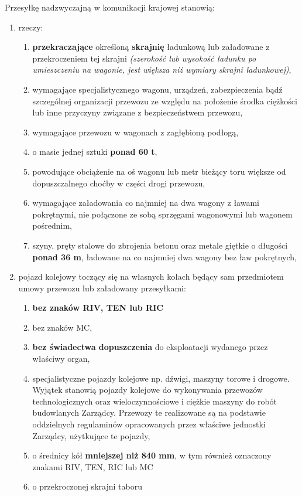 Przesyłkę nadzwyczajną w komunikacji krajowej stanowią:

\begin{enumerate}
	\item rzeczy:
	\begin{enumerate}
		\item \textbf{przekraczające} określoną \textbf{skrajnię} ładunkową lub załadowane z przekroczeniem tej skrajni \textit{(szerokość lub wysokość ładunku po umieszczeniu na wagonie, jest większa niż wymiary skrajni ładunkowej)},
		\item wymagające specjalistycznego wagonu, urządzeń, zabezpieczenia bądź szczególnej organizacji przewozu ze względu na położenie środka ciężkości lub inne przyczyny związane z bezpieczeństwem przewozu,
		\item wymagające przewozu w wagonach z zagłębioną podłogą,
		\item o masie jednej sztuki \textbf{ponad 60 t},
		\item powodujące obciążenie na oś wagonu lub metr bieżący toru większe od dopuszczalnego choćby w części drogi przewozu,
		\item wymagające załadowania co najmniej na dwa wagony z ławami pokrętnymi, nie połączone ze sobą sprzęgami wagonowymi lub wagonem pośrednim,
		\item szyny, pręty stalowe do zbrojenia betonu oraz metale giętkie o długości \textbf{ponad 36 m}, ładowane na co najmniej dwa wagony bez ław pokrętnych,
	\end{enumerate}
	\item pojazd kolejowy toczący się na własnych kołach będący sam przedmiotem umowy przewozu lub załadowany przesyłkami:
	\begin{enumerate}
		\item \textbf{ bez znaków RIV, TEN lub RIC}
		\item bez znaków MC,
		\item \textbf{bez świadectwa dopuszczenia} do eksploatacji wydanego przez właściwy organ,
		\item specjalistyczne pojazdy kolejowe np. dźwigi, maszyny torowe i drogowe. Wyjątek stanowią pojazdy kolejowe do wykonywania przewozów technologicznych oraz wieloczynnościowe i ciężkie maszyny do robót budowlanych Zarządcy. Przewozy te realizowane są na podstawie oddzielnych regulaminów opracowanych przez właściwe jednostki Zarządcy, użytkujące te pojazdy,
		\item o średnicy kół \textbf{mniejszej niż 840 mm}, w tym również oznaczony znakami RIV, TEN, RIC lub MC
		\item o przekroczonej skrajni taboru
	\end{enumerate}
\end{enumerate}

